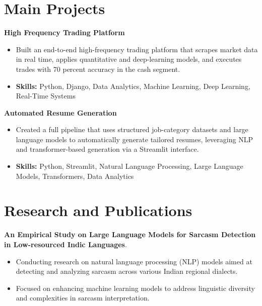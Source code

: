 \documentclass[a4paper,11pt]{article}
\begin{document}
\section{\textbf{Main Projects}}

\vspace{1mm}
  \textbf{High Frequency Trading Platform  }
\vspace{-1.5mm} %
\begin{itemize}
  \item Built an end-to-end high-frequency trading platform that scrapes market data in real time, applies quantitative and deep-learning models, and executes trades with 70 percent accuracy in the cash segment.
\vspace{-3mm}
  \item \textbf{Skills:} Python, Django, Data Analytics, Machine Learning, Deep Learning, Real-Time Systems
\end{itemize}


\vspace{1mm}
   \textbf{Automated Resume Generation }
\vspace{-1.5mm} %
\begin{itemize}
  \item Created a full pipeline that uses structured job-category datasets and large language models to automatically generate tailored resumes, leveraging NLP and transformer-based generation via a Streamlit interface.
\vspace{-3mm}
  \item \textbf{Skills:} Python, Streamlit, Natural Language Processing, Large Language Models, Transformers, Data Analytics
\end{itemize}



\section{\textbf{Research and Publications} \hfill }
\vspace{1mm}
  \textbf{An Empirical Study on Large Language Models for Sarcasm Detection in Low-resourced Indic Languages}.
\vspace{-1mm} %
\begin{itemize}
  \item Conducting research on natural language processing (NLP) models aimed at detecting and analyzing sarcasm across various Indian regional dialects.
\vspace{-3mm}
  \item Focused on enhancing machine learning models to address linguistic diversity and complexities in sarcasm interpretation.
\end{itemize}
\end{document}
